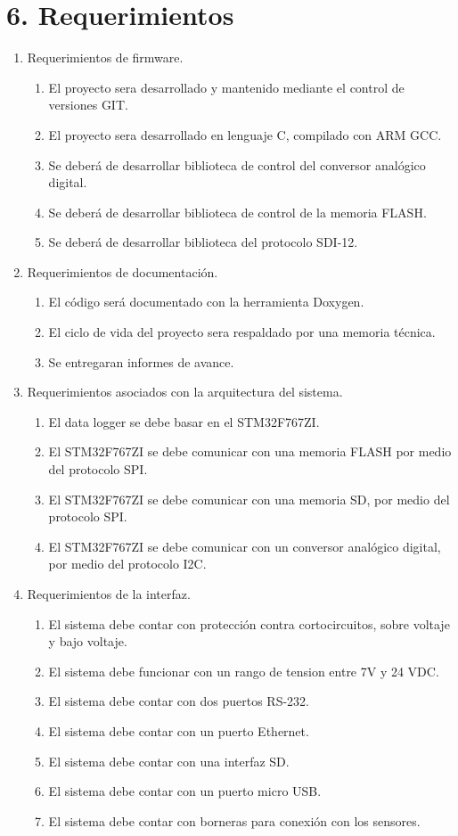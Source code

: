 \documentclass[
11pt, %
]{charter}
\begin{document}
\section{6. Requerimientos}
\label{sec:requerimientos}

\begin{enumerate}
	\item Requerimientos de firmware.
		\begin{enumerate}
			\item El proyecto sera desarrollado y mantenido mediante el control de versiones GIT. 
			\item El proyecto sera desarrollado en lenguaje C, compilado con ARM GCC.
			\item Se deberá de desarrollar biblioteca de control del conversor analógico digital.
			\item Se deberá de desarrollar biblioteca de control de la memoria FLASH. 
			\item Se deberá de desarrollar biblioteca del protocolo SDI-12.
		\end{enumerate}
	\item Requerimientos de documentación.
		\begin{enumerate}
			\item El código será documentado con la herramienta Doxygen.
			\item El ciclo de vida del proyecto sera respaldado por una memoria técnica.
			\item Se entregaran informes de avance.
		\end{enumerate}
	\item Requerimientos asociados con la arquitectura del sistema.
		\begin{enumerate}
		\item El data logger se debe basar en el STM32F767ZI.
		\item El STM32F767ZI se debe comunicar con una memoria FLASH por medio del protocolo SPI.
		\item El STM32F767ZI se debe comunicar con una memoria SD, por medio del protocolo SPI.
		\item El STM32F767ZI se debe comunicar con un conversor analógico digital, por medio del protocolo I2C.
		\end{enumerate}
	\item Requerimientos de la interfaz.
		\begin{enumerate}
		\item El sistema debe contar con protección contra cortocircuitos, sobre voltaje y bajo voltaje. 
		\item El sistema debe funcionar con un rango de tension entre 7V y 24 VDC.
		\item El sistema debe contar con dos puertos RS-232.
		\item El sistema debe contar con un puerto Ethernet.
		\item El sistema debe contar con una interfaz SD.
		\item El sistema debe contar con un puerto micro USB.
		\item El sistema debe contar con borneras para conexión con los sensores.
		\end{enumerate}
\end{enumerate}
\end{document}
